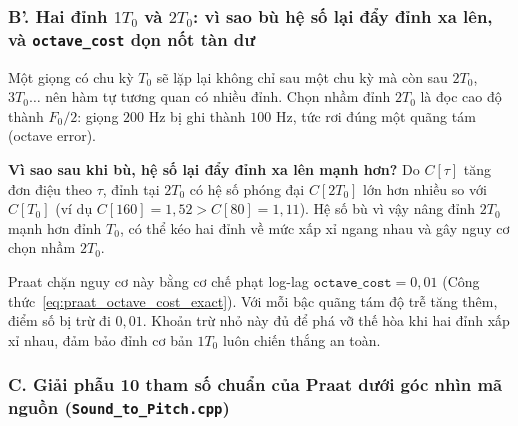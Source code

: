 \documentclass[11pt,a4paper]{article}
\begin{document}
\subsubsection*{B'. Hai đỉnh $1T_0$ và $2T_0$: vì sao bù hệ số lại đẩy đỉnh xa lên, và \texttt{octave\_cost} dọn nốt tàn dư}

Một giọng có chu kỳ $T_0$ sẽ lặp lại không chỉ sau một chu kỳ mà còn sau $2T_0$, $3T_0\dots$ nên hàm tự tương quan có nhiều đỉnh. Chọn nhầm đỉnh $2T_0$ là đọc cao độ thành $F_0/2$: giọng $200\text{ Hz}$ bị ghi thành $100\text{ Hz}$, tức rơi đúng một quãng tám (octave error).

\textbf{Vì sao sau khi bù, hệ số lại đẩy đỉnh xa lên mạnh hơn?} Do $C[\tau]$ tăng đơn điệu theo $\tau$, đỉnh tại $2T_0$ có hệ số phóng đại $C[2T_0]$ lớn hơn nhiều so với $C[T_0]$ (ví dụ $C[160] = 1{,}52 > C[80] = 1{,}11$). Hệ số bù vì vậy nâng đỉnh $2T_0$ mạnh hơn đỉnh $T_0$, có thể kéo hai đỉnh về mức xấp xỉ ngang nhau và gây nguy cơ chọn nhầm $2T_0$.

Praat chặn nguy cơ này bằng cơ chế phạt log-lag $\texttt{octave\_cost} = 0{,}01$ (Công thức~\ref{eq:praat_octave_cost_exact}). Với mỗi bậc quãng tám độ trễ tăng thêm, điểm số bị trừ đi $0{,}01$. Khoản trừ nhỏ này đủ để phá vỡ thế hòa khi hai đỉnh xấp xỉ nhau, đảm bảo đỉnh cơ bản $1T_0$ luôn chiến thắng an toàn.

\subsubsection*{C. Giải phẫu 10 tham số chuẩn của Praat dưới góc nhìn mã nguồn (\texttt{Sound\_to\_Pitch.cpp})}
\end{document}
